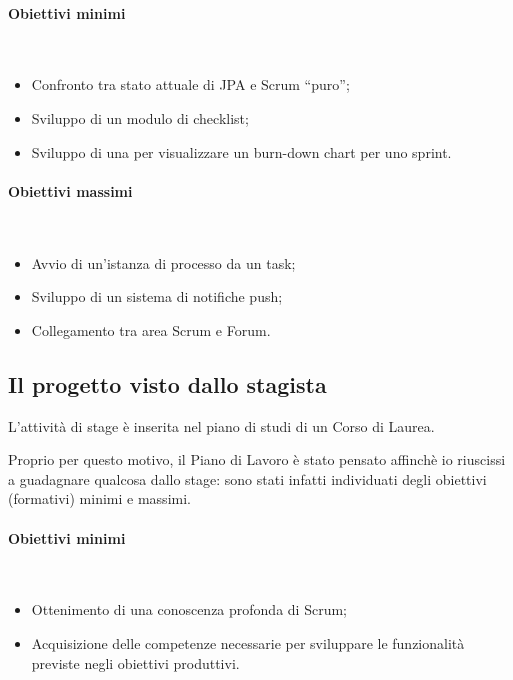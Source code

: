 \paragraph{Obiettivi minimi} \mbox{} \\

\begin{itemize}
\item Confronto tra stato attuale di JPA e Scrum ``puro'';
\item Sviluppo di un modulo di checklist;
\item Sviluppo di una  per visualizzare un burn-down chart
  per uno sprint.
\end{itemize}

\paragraph{Obiettivi massimi} \mbox{} \\

\begin{itemize}
\item Avvio di un'istanza di processo da un task;
\item Sviluppo di un sistema di notifiche push;
\item Collegamento tra area Scrum e Forum.
\end{itemize}

\subsection{Il progetto visto dallo stagista}

L'attività di stage è inserita nel piano di studi di un Corso di Laurea.

Proprio per questo motivo, il Piano di Lavoro è stato pensato affinchè io
riuscissi a guadagnare qualcosa dallo stage: sono stati infatti individuati
degli obiettivi (formativi) minimi e massimi.

\paragraph{Obiettivi minimi} \mbox{} \\

\begin{itemize}
\item Ottenimento di una conoscenza profonda di Scrum;
\item Acquisizione delle competenze necessarie per sviluppare le funzionalità
  previste negli obiettivi produttivi.
\end{itemize}

